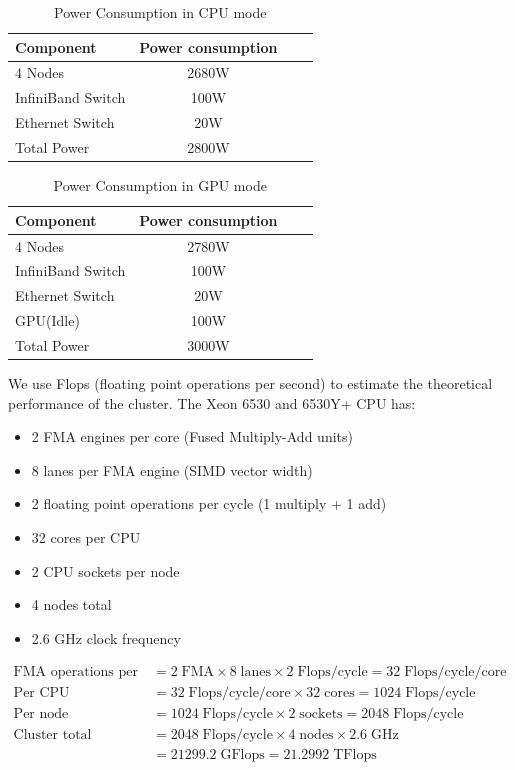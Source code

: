 \documentclass[a4paper,12pt]{article}
\begin{document}
\begin{table}[H]
\centering
\vspace{0.5cm}
\begin{tabular}{lccc}  %
\toprule
Component & Power consumption \\
\midrule
4 Nodes & 2680W \\
InfiniBand Switch & 100W \\
Ethernet Switch & 20W \\
Total Power & 2800W \\
\bottomrule
\end{tabular}
\caption{Power Consumption in CPU mode}
\end{table}

\begin{table}[H]
\centering
\vspace{0.5cm}
\begin{tabular}{lccc}  %
\toprule
Component & Power consumption \\
\midrule
4 Nodes & 2780W \\
InfiniBand Switch & 100W \\
Ethernet Switch & 20W \\
GPU(Idle) & 100W \\
Total Power & 3000W \\
\bottomrule
\end{tabular}
\caption{Power Consumption in GPU mode}
\end{table}

We use Flops (floating point operations per second) to estimate the theoretical performance of the cluster.
The Xeon 6530 and 6530Y+ CPU has:
\begin{itemize}
    \item 2 FMA engines per core (Fused Multiply-Add units)
    \item 8 lanes per FMA engine (SIMD vector width)  
    \item 2 floating point operations per cycle (1 multiply + 1 add)
    \item 32 cores per CPU
    \item 2 CPU sockets per node
    \item 4 nodes total
    \item 2.6 GHz clock frequency
\end{itemize}

\begin{align*}
\text{FMA operations per cycle} &= 2\;\text{FMA} \times 8\;\text{lanes} \times 2\;\text{Flops/cycle} = 32\;\text{Flops/cycle/core} \\
\text{Per CPU} &= 32\;\text{Flops/cycle/core} \times 32\;\text{cores} = 1024\;\text{Flops/cycle} \\
\text{Per node} &= 1024\;\text{Flops/cycle} \times 2\;\text{sockets} = 2048\;\text{Flops/cycle} \\
\text{Cluster total} &= 2048\;\text{Flops/cycle} \times 4\;\text{nodes} \times 2.6\;\text{GHz} \\
&= 21299.2\;\text{GFlops} = 21.2992\;\text{TFlops}
\end{align*}
\end{document}
